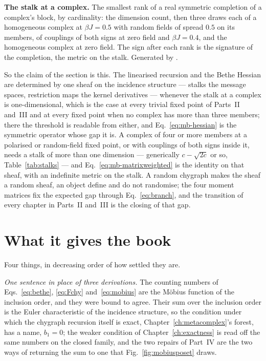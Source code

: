 \begin{table}[tb]
\centering
\begin{adjustbox}{width=\linewidth}

\end{adjustbox}
\caption{\textbf{The stalk at a complex.} The smallest rank of a real
symmetric completion of a complex's block, by cardinality: the dimension
count, then three draws each of a homogeneous complex at $\beta J=0.5$
with random fields of spread $0.5$ on its members, of couplings of both
signs at zero field and $\beta J=0.4$, and the homogeneous complex at zero
field. The sign after each rank is the signature of the completion, the
metric on the stalk. Generated by
.}
\label{tab:stalks}
\end{table}

So the claim of the section is this. The linearised recursion and the
Bethe Hessian are determined by one sheaf on the incidence structure ---
stalks the message spaces, restriction maps the kernel derivatives ---
whenever the stalk at a complex is one-dimensional, which is the case at
every trivial fixed point of Parts~II and~III and at every fixed point
when no complex has more than three members; there the threshold is
readable from either, and Eq.~\eqref{eq:mb-hessian} is the symmetric
operator whose gap it is. A complex of four or more members at a
polarised or random-field fixed point, or with couplings of both signs
inside it, needs a stalk of more than one dimension --- generically
$c-\sqrt{2c}$ or so, Table~\ref{tab:stalks} --- and
Eq.~\eqref{eq:mb-matrixweighted} is the identity on that sheaf, with an
indefinite metric on the stalk. A random chygraph makes the sheaf a random sheaf, an
object \citet{hansen2019} define and do not randomise; the four moment
matrices fix the expected gap through Eq.~\eqref{eq:branch}, and the
transition of every chapter in Parts~II and~III is the closing of that
gap.

\section{What it gives the book}
\label{sec:mb-gives}

Four things, in decreasing order of how settled they are.

\emph{One sentence in place of three derivations.} The counting numbers of
Eqs.~\eqref{eq:bethe}, \eqref{eq:Fchy} and~\eqref{eq:mobius} are the
M\"obius function of the inclusion order, and they were bound to agree. Their
sum over the inclusion order is the Euler characteristic of the incidence
structure, so the condition under which the chygraph recursion itself is
exact, Chapter~\ref{ch:metacomplex}'s forest, has a name, $b_{1}=0$; the
weaker condition of Chapter~\ref{ch:exactness} is read off the same
numbers on the closed family, and the two repairs of Part~IV are the two
ways of returning the sum to one that Fig.~\ref{fig:mobiusposet} draws.

